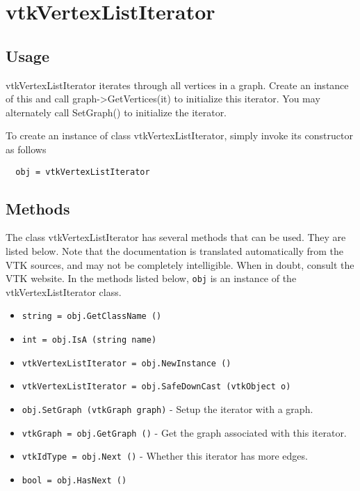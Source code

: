 \section{vtkVertexListIterator}

\subsection{Usage}

 vtkVertexListIterator iterates through all vertices in a graph.
 Create an instance of this and call graph->GetVertices(it) to initialize
 this iterator. You may alternately call SetGraph() to initialize the
 iterator.


To create an instance of class vtkVertexListIterator, simply
invoke its constructor as follows
\begin{verbatim}
  obj = vtkVertexListIterator
\end{verbatim}
\subsection{Methods}

The class vtkVertexListIterator has several methods that can be used.
  They are listed below.
Note that the documentation is translated automatically from the VTK sources,
and may not be completely intelligible.  When in doubt, consult the VTK website.
In the methods listed below, \verb|obj| is an instance of the vtkVertexListIterator class.
\begin{itemize}
\item  \verb|string = obj.GetClassName ()|

\item  \verb|int = obj.IsA (string name)|

\item  \verb|vtkVertexListIterator = obj.NewInstance ()|

\item  \verb|vtkVertexListIterator = obj.SafeDownCast (vtkObject o)|

\item  \verb|obj.SetGraph (vtkGraph graph)| -  Setup the iterator with a graph.

\item  \verb|vtkGraph = obj.GetGraph ()| -  Get the graph associated with this iterator.

\item  \verb|vtkIdType = obj.Next ()| -  Whether this iterator has more edges.

\item  \verb|bool = obj.HasNext ()|

\end{itemize}
